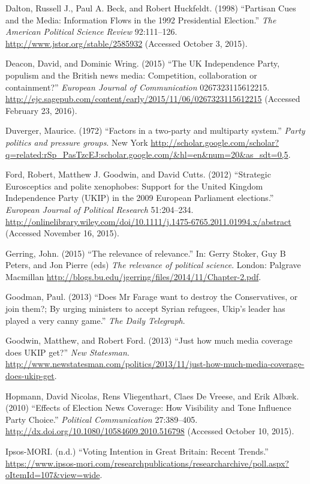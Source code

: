 \documentclass[12pt,article]{article}
\begin{document}
Dalton, Russell J., Paul A. Beck, and Robert Huckfeldt. (1998)
``Partisan Cues and the Media: Information Flows in the 1992
Presidential Election.'' \emph{The American Political Science Review}
92:111--126. \url{http://www.jstor.org/stable/2585932} (Accessed October
3, 2015).

Deacon, David, and Dominic Wring. (2015) ``The UK Independence Party,
populism and the British news media: Competition, collaboration or
containment?'' \emph{European Journal of Communication}
0267323115612215.
\url{http://ejc.sagepub.com/content/early/2015/11/06/0267323115612215}
(Accessed February 23, 2016).

Duverger, Maurice. (1972) ``Factors in a two-party and multiparty
system.'' \emph{Party politics and pressure groups}. New York
\url{http://scholar.google.com/scholar?q=related:rSp_PasTzcEJ:scholar.google.com/\&hl=en\&num=20\&as_sdt=0,5}.

Ford, Robert, Matthew J. Goodwin, and David Cutts. (2012) ``Strategic
Eurosceptics and polite xenophobes: Support for the United Kingdom
Independence Party (UKIP) in the 2009 European Parliament elections.''
\emph{European Journal of Political Research} 51:204--234.
\url{http://onlinelibrary.wiley.com/doi/10.1111/j.1475-6765.2011.01994.x/abstract}
(Accessed November 16, 2015).

Gerring, John. (2015) ``The relevance of relevance.'' In: Gerry Stoker,
Guy B Peters, and Jon Pierre (eds) \emph{The relevance of political
science}. London: Palgrave Macmillan
\url{http://blogs.bu.edu/jgerring/files/2014/11/Chapter-2.pdf}.

Goodman, Paul. (2013) ``Does Mr Farage want to destroy the
Conservatives, or join them?; By urging ministers to accept Syrian
refugees, Ukip's leader has played a very canny game.'' \emph{The Daily
Telegraph}.

Goodwin, Matthew, and Robert Ford. (2013) ``Just how much media coverage
does UKIP get?'' \emph{New Statesman}.
\url{http://www.newstatesman.com/politics/2013/11/just-how-much-media-coverage-does-ukip-get}.

Hopmann, David Nicolas, Rens Vliegenthart, Claes De Vreese, and Erik
Alb{æ}k. (2010) ``Effects of Election News Coverage: How Visibility and
Tone Influence Party Choice.'' \emph{Political Communication}
27:389--405. \url{http://dx.doi.org/10.1080/10584609.2010.516798}
(Accessed October 10, 2015).

Ipsos-MORI. (n.d.) ``Voting Intention in Great Britain: Recent Trends.''
\url{https://www.ipsos-mori.com/researchpublications/researcharchive/poll.aspx?oItemId=107\&view=wide}.
\end{document}
